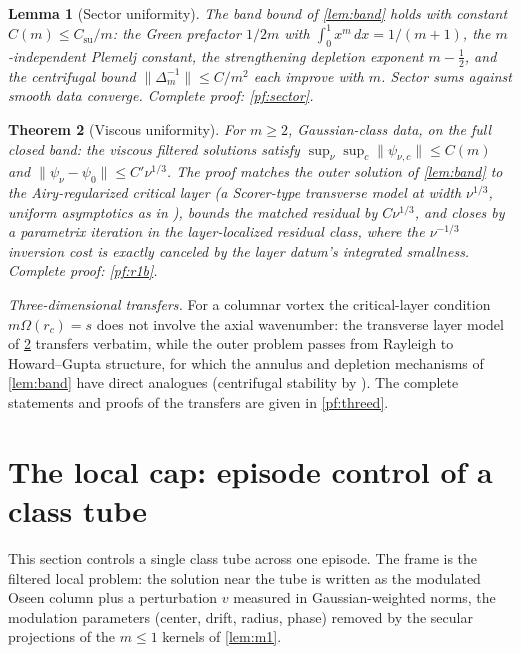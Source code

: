 \documentclass[11pt,letterpaper]{amsart}
\newtheorem{theorem}{Theorem}[section]
\newtheorem{lemma}[theorem]{Lemma}
\theoremstyle{definition}
\theoremstyle{remark}
\newcommand{\norm}[1]{\lVert #1 \rVert}
\begin{document}
\begin{lemma}[Sector uniformity]\label{lem:sector}
The band bound of \cref{lem:band} holds with constant $C(m)\le C_{\mathrm{su}}/m$:
the Green prefactor $1/2m$ with $\int_0^1x^m\,dx=1/(m+1)$, the $m$-independent
Plemelj constant, the strengthening depletion exponent $m-\tfrac12$, and the
centrifugal bound $\norm{\Delta_m^{-1}}\le C/m^2$ each improve with $m$. Sector sums
against smooth data converge. Complete proof: \cref{pf:sector}.
\end{lemma}

\begin{theorem}[Viscous uniformity]\label{thm:r1b}
For $m\ge2$, Gaussian-class data, on the full closed band: the viscous filtered
solutions satisfy $\sup_\nu\sup_c\norm{\psi_{\nu,c}}\le C(m)$ and
$\norm{\psi_\nu-\psi_0}\le C'\nu^{1/3}$. The proof matches the outer solution of
\cref{lem:band} to the Airy-regularized critical layer (a Scorer-type transverse
model at width $\nu^{1/3}$, uniform asymptotics as in \cite{Olver1974}), bounds the
matched residual by $C\nu^{1/3}$, and closes by a parametrix iteration in the
layer-localized residual class, where the $\nu^{-1/3}$ inversion cost is exactly
canceled by the layer datum's integrated smallness. Complete proof: \cref{pf:r1b}.
\end{theorem}

\emph{Three-dimensional transfers.} For a columnar vortex the critical-layer condition
$m\Omega(r_c)=s$ does not involve the axial wavenumber: the transverse layer model of
\cref{thm:r1b} transfers verbatim, while the outer problem passes from Rayleigh to
Howard--Gupta structure, for which the annulus and depletion mechanisms of
\cref{lem:band} have direct analogues (centrifugal stability by
\cite{GallaySmets2020}). The complete statements and proofs of the transfers are given
in \cref{pf:threed}.

\section{The local cap: episode control of a class tube}\label{sec:jc1}

This section controls a single class tube across one episode. The frame is the
filtered local problem: the solution near the tube is written as the modulated Oseen
column plus a perturbation $v$ measured in Gaussian-weighted norms, the modulation
parameters (center, drift, radius, phase) removed by the secular projections of the
$m\le1$ kernels of \cref{lem:m1}.
\end{document}
